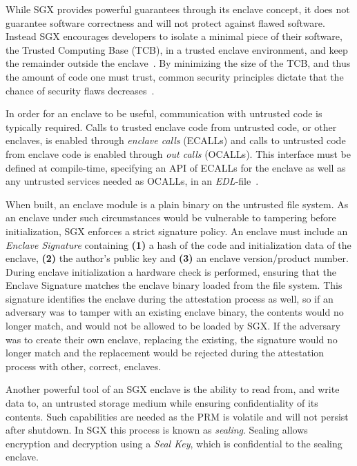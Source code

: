 \documentclass{article}
\begin{document}
			While SGX provides powerful guarantees through its enclave concept, it does not guarantee software correctness and will not protect against flawed software.
			Instead SGX encourages developers to isolate a minimal piece of their software, the Trusted Computing Base (TCB), in a trusted enclave environment, and keep the remainder outside the enclave~\cite{intel_sgx_guide}.
			By minimizing the size of the TCB, and thus the amount of code one must trust, common security principles dictate that the chance of security flaws decreases~\cite{intel_sgx_guide}.

			In order for an enclave to be useful, communication with untrusted code is typically required.
			Calls to trusted enclave code from untrusted code, or other enclaves, is enabled through \textit{enclave calls} (ECALLs) and calls to untrusted code from enclave code is enabled through \textit{out calls} (OCALLs).
			This interface must be defined at compile-time, specifying an API of ECALLs for the enclave as well as any untrusted services needed as OCALLs, in an \textit{EDL}-file~\cite{intel_sgx_guide}.

			When built, an enclave module is a plain binary on the untrusted file system.
			As an enclave under such circumstances would be vulnerable to tampering before initialization, SGX enforces a strict signature policy.
			An enclave must include an \textit{Enclave Signature} containing \textbf{(1)} a hash of the code and initialization data of the enclave, \textbf{(2)} the author's public key and \textbf{(3)} an enclave version/product number.
			During enclave initialization a hardware check is performed, ensuring that the Enclave Signature matches the enclave binary loaded from the file system.
			This signature identifies the enclave during the attestation process as well, so if an adversary was to tamper with an existing enclave binary, the contents would no longer match, and would not be allowed to be loaded by SGX.
			If the adversary was to create their own enclave, replacing the existing, the signature would no longer match and the replacement would be rejected during the attestation process with other, correct, enclaves.

			Another powerful tool of an SGX enclave is the ability to read from, and write data to, an untrusted storage medium while ensuring confidentiality of its contents.
			Such capabilities are needed as the PRM is volatile and will not persist after shutdown.
			In SGX this process is known as \textit{sealing}.
			Sealing allows encryption and decryption using a \textit{Seal Key}, which is confidential to the sealing enclave.
\end{document}
